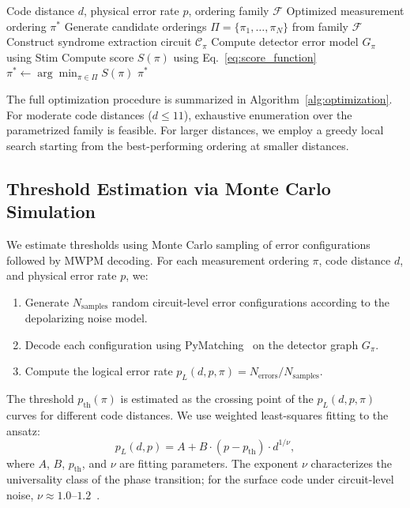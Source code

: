\documentclass[
    reprint,
    aps,
    prx,
    superscriptaddress,
    longbibliography
]{revtex4-2}
\begin{document}
\begin{algorithm}[t]
\caption{Measurement-cycle optimization for the rotated planar surface code.}
\label{alg:optimization}
\begin{algorithmic}[1]
\Require Code distance $d$, physical error rate $p$, ordering family $\mathcal{F}$
\Ensure Optimized measurement ordering $\pi^*$
\State Generate candidate orderings $\Pi = \{\pi_1, \ldots, \pi_N\}$ from family $\mathcal{F}$
    \State Construct syndrome extraction circuit $\mathcal{C}_\pi$
    \State Compute detector error model $G_\pi$ using Stim
    \State Compute score $S(\pi)$ using Eq.~\eqref{eq:score_function}
\EndFor
\State $\pi^* \gets \arg\min_{\pi \in \Pi} S(\pi)$
\State \Return $\pi^*$
\end{algorithmic}
\end{algorithm}

The full optimization procedure is summarized in Algorithm~\ref{alg:optimization}. For moderate code distances ($d \leq 11$), exhaustive enumeration over the parametrized family is feasible. For larger distances, we employ a greedy local search starting from the best-performing ordering at smaller distances.

\subsection{Threshold Estimation via Monte Carlo Simulation}
\label{subsec:monte_carlo}

We estimate thresholds using Monte Carlo sampling of error configurations followed by MWPM decoding. For each measurement ordering $\pi$, code distance $d$, and physical error rate $p$, we:
\begin{enumerate}[label=(\roman*)]
    \item Generate $N_{\text{samples}}$ random circuit-level error configurations according to the depolarizing noise model.
    \item Decode each configuration using PyMatching~\cite{Higgott2023Sparse} on the detector graph $G_\pi$.
    \item Compute the logical error rate $p_L(d, p, \pi) = N_{\text{errors}} / N_{\text{samples}}$.
\end{enumerate}

The threshold $p_{\text{th}}(\pi)$ is estimated as the crossing point of the $p_L(d, p, \pi)$ curves for different code distances. We use weighted least-squares fitting to the ansatz:
\begin{equation}
    p_L(d, p) = A + B \cdot (p - p_{\text{th}}) \cdot d^{1/\nu},
    \label{eq:threshold_ansatz}
\end{equation}
where $A$, $B$, $p_{\text{th}}$, and $\nu$ are fitting parameters. The exponent $\nu$ characterizes the universality class of the phase transition; for the surface code under circuit-level noise, $\nu \approx 1.0$--$1.2$~\cite{Wang2003Confinement, Stephens2014FaultTolerant}.
\end{document}
